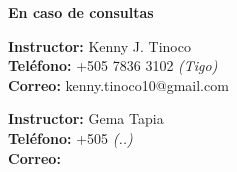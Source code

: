 \vspace*{\fill}
\begin{flushright}
    \textbf{\large En caso de consultas}

    \textbf{Instructor:} Kenny J. Tinoco \\
    \textbf{Teléfono:} +505 7836 3102 \emph{(Tigo)} \\
    \textbf{Correo:} kenny.tinoco10@gmail.com

    \textbf{Instructor:} Gema Tapia\\
    \textbf{Teléfono:} +505  \emph{(..)}\\
    \textbf{Correo:}

\end{flushright}
\vspace*{0cm}